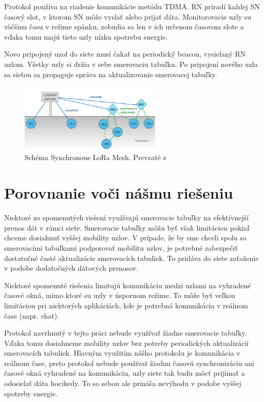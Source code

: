 \documentclass[slovak,master]{diploma}
\begin{document}
Protokol používa na riadenie komunikácie metódu TDMA. RN priradí každej SN časový slot, v ktorom SN môže vyslať alebo prijať dáta.
Monitorovacie uzly su väčšinu času v režime spánku, zobudia sa len v ich určenom časovom slote a vďaka tomu majú tieto uzly nízku spotrebu energie.

Novo pripojený uzol do siete musí čakať na periodický beacon, vysielaný RN uzlom. Všetky uzly si držia v sebe smerovaciu tabuľku. Po pripojení nového uzla sa sieťou sa propaguje 
správa na aktualizovanie smerovacej tabuľky.

\begin{figure}
	\centering
	\includegraphics[width=0.6\textwidth]{Figures/synchronouslorameshnetwork.png}
	\caption{Schéma Synchronous LoRa Mesh. Prevzaté z \cite{synchronouslorameshnetwork}}
	\label{fig:synchronouslora}
\end{figure}


\section{Porovnanie voči nášmu riešeniu}
Niektoré zo spomenutých riešení využívajú smerovacie tabuľky na efektívnejší prenos dát v rámci siete. Smerovacie tabuľky môžu byť však limitáciou pokiaľ 
chceme dosiahnuť vyššej mobility uzlov. V prípade, že by sme chceli spolu so smerovacími tabuľkami podporovať mobilitu uzlov, je potrebné zabezpečiť dostatočné časté aktualizácie smerovacích tabuliek.
To pridáva do siete zaťaženie v podobe dodatočných dátových prenosov.

Niektoré spomenuté riešenia limitujú komunikáciu medzi uzlami na vyhradené časové okná, mimo ktoré su uzly v úspornom režime. To môže byť 
veľkou limitáciou pri niektorých aplikáciách, kde je potrebná komunikácia v reálnom čase  (napr. chat).

Protokol navrhnutý v tejto práci nebude využívať žiadne smerovacie tabuľky. Vďaka tomu dosiahneme mobility uzlov bez potreby 
periodických aktualizácií smerovacích tabuliek. Hlavným využitím nášho protokolu je komunikácia v reálnom čase, preto protokol nebude používať 
žiadnu časovú synchronizáciu ani časové okná vyhradené na komunikáciu, uzly siete tak budu môcť prijímať a odosielať dáta hocikedy.
To so sebou ale prináša nevýhodu v podobe vyššej spotreby energie.
\end{document}
